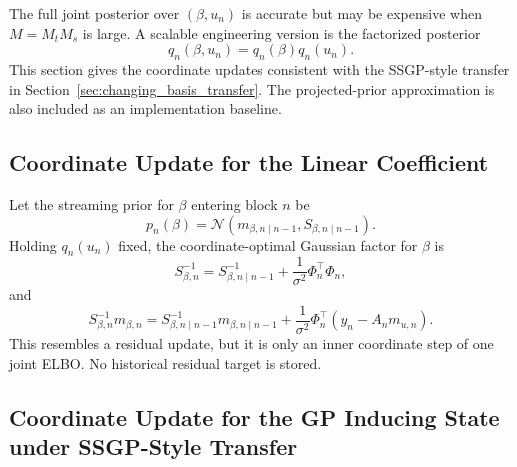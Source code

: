 \documentclass[12pt]{article}
\begin{document}
The full joint posterior over \((\beta,u_n)\) is accurate but may be expensive when
\(M=M_tM_s\) is large. A scalable engineering version is the factorized posterior
\begin{equation}
    q_n(\beta,u_n)=q_n(\beta)q_n(u_n).
\end{equation}
This section gives the coordinate updates consistent with the SSGP-style transfer in
Section~\ref{sec:changing_basis_transfer}. The projected-prior approximation is also
included as an implementation baseline.

\subsection{Coordinate Update for the Linear Coefficient}
\label{subsec:coordinate_beta}

Let the streaming prior for \(\beta\) entering block \(n\) be
\begin{equation}
    p_n(\beta)
    =
    \mathcal{N}
    \left(
        m_{\beta,n\mid n-1},
        S_{\beta,n\mid n-1}
    \right).
\end{equation}
Holding \(q_n(u_n)\) fixed, the coordinate-optimal Gaussian factor for \(\beta\) is
\begin{equation}
    S_{\beta,n}^{-1}
    =
    S_{\beta,n\mid n-1}^{-1}
    +
    \frac{1}{\sigma^2}\Phi_n^\top\Phi_n,
    \label{eq:mf_beta_precision}
\end{equation}
and
\begin{equation}
    S_{\beta,n}^{-1}m_{\beta,n}
    =
    S_{\beta,n\mid n-1}^{-1}m_{\beta,n\mid n-1}
    +
    \frac{1}{\sigma^2}
    \Phi_n^\top
    \left(
        y_n-A_nm_{u,n}
    \right).
    \label{eq:mf_beta_info}
\end{equation}
This resembles a residual update, but it is only an inner coordinate step of one joint
ELBO. No historical residual target is stored.

\subsection{Coordinate Update for the GP Inducing State under SSGP-Style Transfer}
\label{subsec:coordinate_u_ssgp_transfer}
\end{document}
